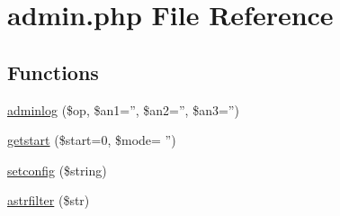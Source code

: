 \hypertarget{admin_8php}{\section{admin.\+php File Reference}
\label{admin_8php}
}
\subsection*{Functions}
\begin{DoxyCompactItemize}
\item 
\hyperlink{admin_8php_a7f632c5a8680d949381630c59ab857cd}{adminlog} (\$op, \$an1='', \$an2='', \$an3='')
\item 
\hyperlink{admin_8php_a774c9803a78dae80dd7b9a2301393b4a}{getstart} (\$start=0, \$mode= '')
\item 
\hyperlink{admin_8php_a46305e0d4c82055b75d574bb6f45e059}{setconfig} (\$string)
\item 
\hyperlink{admin_8php_a674b100d3ac8a85d4c48f54e171d6e56}{astrfilter} (\$str)
\end{DoxyCompactItemize}
